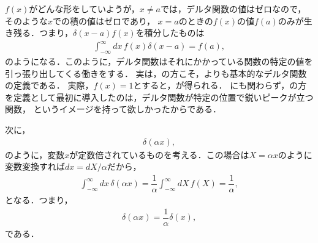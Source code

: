 \noindent
$f(x)$がどんな形をしていようが，$x\neq a$では，デルタ関数の値はゼロなので，そのような$x$での積の値はゼロであり，
$x=a$のときの$f(x)$の値$f(a)$のみが生き残る．つまり，$\delta(x-a)f(x)$を積分したものは
\begin{align}
  \int_{-\infty}^{\infty} dx\, f\left(x\right)\delta\left(x-a\right) = f\left(a\right), \label{delta_func_def_04} 
\end{align}
のようになる．このように，デルタ関数はそれにかかっている関数の特定の値を引っ張り出してくる働きをする．
実は，の方こそ，よりも基本的なデルタ関数の定義である．
実際，$f(x)=1$とすると，が得られる．
にも関わらず，の方を定義として最初に導入したのは，デルタ関数が特定の位置で鋭いピークが立つ関数，
というイメージを持って欲しかったからである．
%

次に，
\begin{align}
 \delta (\alpha x), 
\end{align}
のように，変数$x$が定数倍されているものを考える．この場合は$X=\alpha x$のように変数変換すれば$dx=dX/\alpha$だから，
\begin{align}
 \int_{-\infty}^{\infty}dx\,\delta(\alpha x) = \dfrac{1}{\alpha}\int_{-\infty}^{\infty}dX\,f(X) = \dfrac{1}{\alpha}, 
\end{align}
となる．つまり，
\begin{align}
 \delta(\alpha x) = \dfrac{1}{\alpha}\delta(x), 
\end{align}
である．
%
